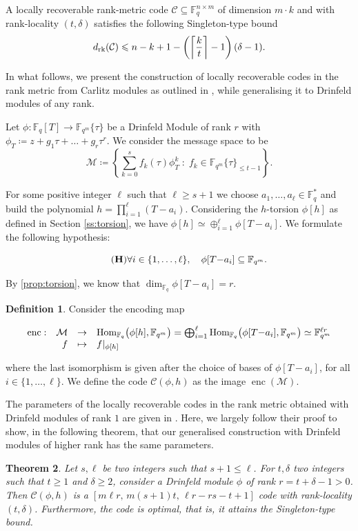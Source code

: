 \documentclass[11pt]{article}
\newtheorem{theorem}{Theorem}[section]
\theoremstyle{definition}
\newtheorem{definition}[theorem]{Definition}
\newcommand{\Function}[5]{
  \[
    \begin{array}{rrcl}
    #1: & #2 & \to     & #3 \\
        & #4 & \mapsto & #5
    \end{array}
  \]
}
\renewcommand\geq{\geqslant}
\renewcommand\leq{\leqslant}
\newcommand\F{\mathbb{F}}
\newcommand\Fq{\mathbb{F}_q}
\newcommand\Fqm{\F_{q^m}}
\newcommand{\Hom}{\text{\rm Hom}}
\newcommand\rk{\text{\rm rk}}
\DeclareMathOperator{\enc}{\mathrm{enc}}
\begin{document}
A locally recoverable rank-metric code $\mathcal{C}\subseteq\Fq^{n\times m}$ %
of dimension $m\cdot k$ and with rank-locality $(t,\delta)$ satisfies the following Singleton-type bound \cite[Theorem 1]{KED19}
\begin{equation}\label{eq:lr-sing-bound}
    d_\rk(\mathcal{C})\leq n-k+1-\left(\left\lceil \frac{k}{t}\right\rceil -1\right)(\delta-1).
\end{equation}

In what follows, we present the construction of locally recoverable codes in the rank metric from Carlitz modules as outlined in \cite{BDM24preprint}, while generalising it to Drinfeld modules of any rank. 

Let $\phi: \Fq[T]\to \F_{q^m}\{\tau\}$ be a Drinfeld Module of rank $r$ with $\phi_T\coloneqq z+g_1 \tau + \dots + g_r\tau^r$. 
We consider the message space to be
\[\mathcal{M}\coloneqq\left\{\sum_{k=0}^s f_k(\tau)\phi_T^k \;:\; f_k\in \F_{q^m}\{\tau\}_{\leq t-1}\right\}.\]

For some positive integer $\ell$ such that $\ell\geq s+1$ we choose $a_1,\dots,a_\ell\in\Fq^*$ and build the polynomial $h=\prod_{i=1}^\ell (T{-}a_i)$. Considering the $h$-torsion  $\phi[h]$ as defined in Section \ref{ss:torsion}, we have $\phi[h]\simeq \oplus_{i=1}^\ell \phi[T{-}a_i]$. We formulate the following hypothesis:

\begin{equation}\label{hyp}\tag{\textbf{H}}
\forall i\in\{1,\dots,\ell\}, \quad \phi[T{-}a_i]\subseteq \Fqm.
\end{equation}

By \cref{prop:torsion}, we know that $\dim_{\Fq} \phi[T{-}a_i]=r$. 

\begin{definition}\label{def:enc}
    Consider the encoding map
    \Function
      {\enc}
      {\mathcal M}
      {\Hom_{\Fq}\big(\phi[h],\Fqm\big)=\bigoplus_{i=1}^\ell \Hom_{\Fq}\big(\phi[T{-}a_i],\Fqm\big)\simeq \Fqm^{\ell r}}
      {f}
      {f|_{\phi[h]}}
      where the last isomorphism is given after the choice of bases of $\phi[T{-}a_i]$, for all $i\in\{1,\dots,\ell \}$.  
We define the code $\mathcal{C}(\phi,h)$ as the image $\enc(\mathcal{M})$. 
\end{definition}


The parameters of the locally recoverable codes in the rank metric obtained with Drinfeld modules of rank $1$ are given in \cite[Theorem~3.4]{BDM24preprint}. Here, we largely follow their proof to show, in the following theorem, that our generalised construction with Drinfeld modules of higher rank has the same parameters.
\begin{theorem}
    Let $s,\ell$ be two integers such that $s+1 \leq \ell$. For $t,\delta$ two integers such that $t\geq 1$ and $\delta\geq 2$, consider a Drinfeld module $\phi$ of rank $r=t+\delta-1>0$. Then $\mathcal{C}(\phi,h)$ is a $[ m \ell r,\, m(s{+}1) t,\, \ell r{-}rs{-}t{+}1]$ code with rank-locality $(t,\delta)$. Furthermore, the code is optimal, that is, it attains the Singleton-type bound.
\end{theorem}
\end{document}
